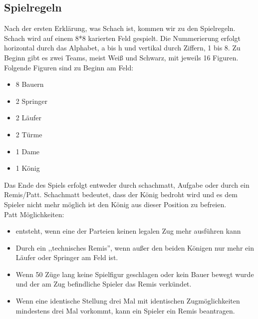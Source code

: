 \documentclass[12pt,a4paper]{article}
\begin{document}
{\subsection{Spielregeln}
\label{SUBSEC:GAMERULES}

Nach der ersten Erklärung, was Schach ist, kommen wir zu den Spielregeln.
Schach wird auf einem 8*8 karierten Feld gespielt. Die Nummerierung erfolgt horizontal durch das Alphabet, a bis h und vertikal durch Ziffern, 1 bis 8.
Zu Beginn gibt es zwei Teams, meist Weiß und Schwarz, mit jeweils 16 Figuren.
Folgende Figuren sind zu Beginn am Feld:
\begin{itemize}
	\item{8 Bauern}
	\item{2 Springer}
	\item{2 Läufer}
	\item{2 Türme}
	\item{1 Dame}
	\item{1 König}
\end{itemize}
Das Ende des Spiels erfolgt entweder durch schachmatt, Aufgabe oder durch ein Remis/Patt. Schachmatt bedeutet, dass der König bedroht wird und es dem Spieler nicht mehr möglich ist den König aus dieser Position zu befreien.\\
Patt Möglichkeiten:
\begin{itemize}
	\item{ entsteht, wenn eine der Parteien keinen legalen Zug mehr ausführen kann }
	\item{Durch ein ,,technisches Remis'', wenn außer den beiden Königen nur mehr ein Läufer oder Springer am Feld ist.}
	\item{Wenn 50 Züge lang keine Spielfigur geschlagen oder kein Bauer bewegt wurde und der am Zug befindliche Spieler das Remis verkündet.}
	\item{Wenn eine identische Stellung drei Mal mit identischen Zugmöglichkeiten mindestens drei Mal vorkommt, kann ein Spieler ein Remis beantragen.}
\end{itemize}

}
\end{document}
